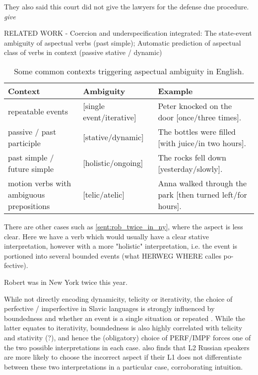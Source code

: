 \begin{exe}
    \ex They also said this court did not give the lawyers for the defense due procedure. \emph{give}
    \label{sent:habitual_wide_application_ex}
\end{exe}

RELATED WORK - Coercion and underspecification integrated: The state-event ambiguity of aspectual verbs (past simple); Automatic prediction of aspectual class of verbs in context (passive stative / dynamic)

\begin{table}[h]
    \centering
    \begin{tabular}{|m{0.3\linewidth} |m{0.3\linewidth}| m{0.4\linewidth}|} \hline
        Context & Ambiguity & Example  \\ \hline \hline
        repeatable events & [single event/iterative] & Peter knocked on the door [once/three times].  \\ \hline
        passive / past participle &  [stative/dynamic] & The bottles were filled [with juice/in two hours]. \\ \hline
        past simple / future simple & [holistic/ongoing] & The rocks fell down [yesterday/slowly]. \\ \hline
        motion verbs with ambiguous prepositions & [telic/atelic] & Anna walked through the park [then turned left/for hours]. \\ \hline
    \end{tabular}
    \caption{Some common contexts triggering aspectual ambiguity in English.}
\end{table}
\label{table:asp_amb_contexts_eng}

There are other cases such as \ref{sent:rob_twice_in_ny}, where the aspect is less clear. Here we have a verb which would usually have a clear stative interpretation, however with a more "holistic" interpretation, i.e. the event is portioned into several bounded events (what HERWEG WHERE calles po-fective).

\begin{exe}
    \ex Robert was in New York twice this year.
    \label{sent:rob_twice_in_ny}
\end{exe}


While not directly encoding dynamicity, telicity or iterativity, the choice of perfective / imperfective in Slavic languages is strongly influenced by boundedness and whether an event is a single situation or repeated \citep{wiemer2017}. While the latter equates to iterativity, boundedness is also highly correlated with telicity and stativity (?), and hence the (obligatory) choice of PERF/IMPF forces one of the two possible interpretations in each case. \citet{errors_in_russian_aspect_apresyan} also finds that L2 Russian speakers are more likely to choose the incorrect aspect if their L1 does not differentiate between these two interpretations in a particular case, corroborating intuition.

